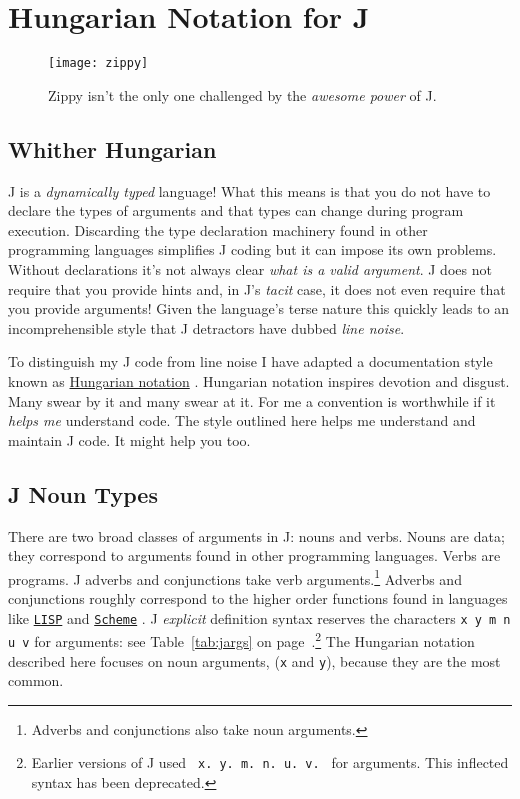 \section{Hungarian Notation for J}\label{ap:jodhung}
   
\begin{figure}[htbp]
  \centering
  \texttt{[image: zippy]}
  \caption[Zippy the Pinhead]{Zippy \cite{zippy} isn't the only one challenged by the \emph{awesome power} of J.}
  \label{eps:zippy}
\end{figure}

\subsection{Whither Hungarian}

J is a \emph{dynamically typed} language!  What this means is that
you do not have to declare the types of arguments and that types
can change during program execution.  Discarding the 
type declaration machinery found in other programming languages simplifies
J coding but it can impose its own problems. Without declarations
it's not always clear \emph{what is a valid argument}.  J does
not require that you provide hints and, in J's \emph{tacit} case, it
does not even require that you provide arguments!  Given
the language's terse nature this quickly leads to an incomprehensible
style that J detractors have dubbed \emph{line noise}. 

To distinguish my J code from line noise I have adapted a documentation
style known as \href{https://en.wikipedia.org/wiki/Hungarian_notation}{Hungarian notation} \cite{wiki:hung}. 
 Hungarian notation inspires devotion and disgust.  Many swear by it and many
 swear at it.  For me a
convention is worthwhile if it \emph{helps me} understand code.  The style
outlined here helps me understand and maintain J code.  It might help you too.

\subsection{J Noun Types}

There are two broad classes of arguments in J: nouns and verbs.  Nouns are data;
they correspond to arguments found in other programming languages.  Verbs are programs.  J adverbs
and conjunctions take verb arguments.\footnote{Adverbs and conjunctions also take noun
arguments.} Adverbs and conjunctions roughly correspond to the
higher order functions found in languages like
\href{https://www.cs.cmu.edu/Groups/AI/html/cltl/cltl2.html}{\texttt{LISP}} \cite{commonlisp} and
\href{https://www-swiss.ai.mit.edu/projects/scheme/}{\texttt{Scheme}} \cite{scheme}. 
J \emph{explicit} definition syntax reserves the characters \texttt{x y m n
u v} for arguments: see Table~\ref{tab:jargs} on page~\pageref{tab:jargs}.\footnote{
Earlier versions of J used  \texttt{ x.\ y.\ m.\ n.\ u.\ v.\ } for arguments.  This inflected
syntax has been deprecated.} The Hungarian notation described here focuses on noun arguments, 
(\texttt{x} and \texttt{y}), because they are the most common.


